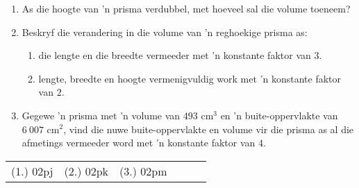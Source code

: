 \begin{exercises}{}
 {
\begin{enumerate}[noitemsep, label=\textbf{\arabic*}. ] 
 \item As die hoogte van 'n prisma verdubbel, met hoeveel sal die volume toeneem?
\item Beskryf die verandering in die volume van 'n reghoekige prisma as:
\begin{enumerate}[noitemsep, label=\textbf{(\alph*)} ] 
\item die lengte en die breedte vermeeder met 'n konstante faktor van $3$.
\item lengte, breedte en hoogte vermenigvuldig work met 'n konstante faktor van $2$.
\end{enumerate}
\item Gegewe 'n prisma met 'n volume van $493$ cm$^{3}$ en 'n buite-oppervlakte van $6~007$ cm$^{2}$, 
vind die nuwe buite-oppervlakte en volume vir die prisma as al die afmetings vermeeder word met 'n konstante faktor van $4$. 
\end{enumerate}

}
\par \practiceinfo
\par \begin{tabular}[h]{cccccc}
(1.)	02pj	&
(2.)	02pk	&
(3.)	02pm	&
\end{tabular}
\end{exercises}

